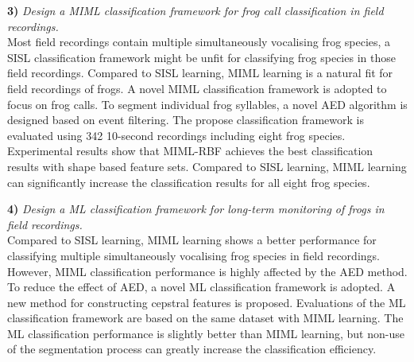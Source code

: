\textbf{3)}  \textit{Design a MIML classification framework for frog call classification in field recordings.} 
\\
Most field recordings contain multiple simultaneously vocalising frog species, a SISL classification framework might be unfit for classifying frog species in those field recordings. Compared to SISL learning, MIML learning is a natural fit for field recordings of frogs. A novel MIML classification framework is adopted to focus on frog calls. To segment individual frog syllables, a novel AED algorithm is designed based on event filtering. The propose classification framework is evaluated using 342 10-second recordings including eight frog species. Experimental results show that MIML-RBF achieves the best classification results with shape based feature sets. Compared to SISL learning, MIML learning can significantly increase the classification results for all eight frog species.

\textbf{4)}  \textit{Design a ML classification framework for long-term monitoring of frogs in field recordings.} 
\\ 
Compared to SISL learning, MIML learning shows a better performance for classifying multiple simultaneously vocalising frog species in field recordings.
However, MIML classification performance is highly affected by the AED method.
To reduce the effect of AED, a novel ML classification framework is adopted.
A new method for constructing cepstral features is proposed. Evaluations of the ML classification framework are based on the same dataset with MIML learning. The ML classification performance is slightly better than MIML learning, but non-use of the segmentation process can greatly increase the classification efficiency.




